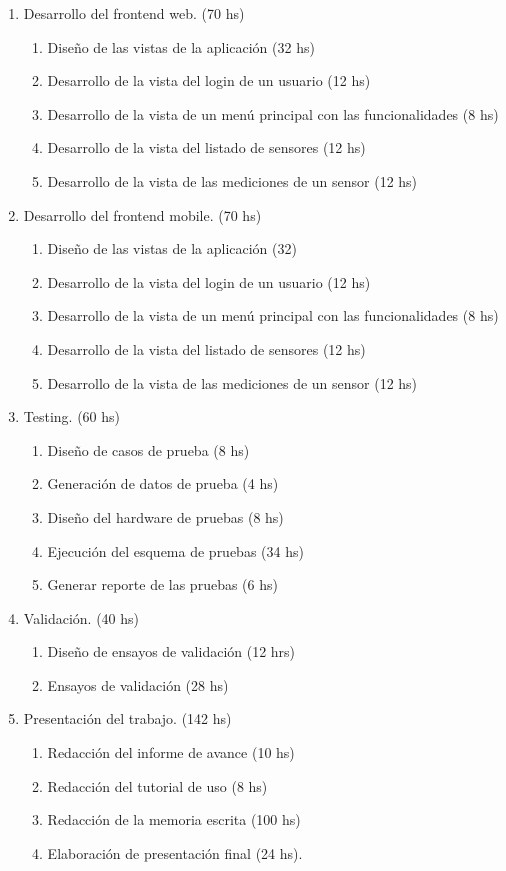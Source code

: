 \documentclass[
11pt, %
]{charter}
\begin{document}
\begin{enumerate}
\begin{enumerate}
	\end{enumerate}
\item Desarrollo del frontend web. (70 hs)
	\begin{enumerate}
	\item Diseño de las vistas de la aplicación (32 hs)
	\item Desarrollo de la vista del login de un usuario (12 hs)
	\item Desarrollo de la vista de un menú principal con las funcionalidades (8 hs)
	\item Desarrollo de la vista del listado de sensores (12 hs)
	\item Desarrollo de la vista de las mediciones de un sensor (12 hs)
	\end{enumerate}
\item Desarrollo del frontend mobile. (70 hs)
	\begin{enumerate}
	\item Diseño de las vistas de la aplicación (32)
	\item Desarrollo de la vista del login de un usuario (12 hs)
	\item Desarrollo de la vista de un menú principal con las funcionalidades (8 hs)
	\item Desarrollo de la vista del listado de sensores (12 hs)
	\item Desarrollo de la vista de las mediciones de un sensor (12 hs)
	\end{enumerate}
\item Testing. (60 hs)
	\begin{enumerate}
	\item Diseño de casos de prueba (8 hs)
	\item Generación de datos de prueba (4 hs)
	\item Diseño del hardware de pruebas (8 hs)
	\item Ejecución del esquema de pruebas (34 hs)
	\item Generar reporte de las pruebas (6 hs)
	\end{enumerate}
\item Validación. (40 hs)
	\begin{enumerate}
	\item Diseño de ensayos de validación (12 hrs)
	\item Ensayos de validación (28 hs)
	\end{enumerate}
\item Presentación del trabajo. (142 hs)
	\begin{enumerate}
	\item Redacción del informe de avance (10 hs)
	\item Redacción del tutorial de uso (8 hs)
	\item Redacción de la memoria escrita (100 hs)
	\item Elaboración de presentación final (24 hs).
	\end{enumerate}	
\end{enumerate}
\end{document}
